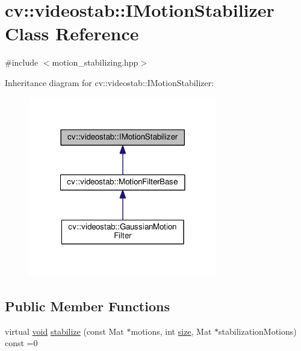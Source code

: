\hypertarget{classcv_1_1videostab_1_1IMotionStabilizer}{\section{cv\-:\-:videostab\-:\-:I\-Motion\-Stabilizer Class Reference}
\label{classcv_1_1videostab_1_1IMotionStabilizer}
}


{\ttfamily \#include $<$motion\-\_\-stabilizing.\-hpp$>$}



Inheritance diagram for cv\-:\-:videostab\-:\-:I\-Motion\-Stabilizer\-:\nopagebreak
\begin{figure}[H]
\begin{center}
\leavevmode
\includegraphics[width=234pt]{classcv_1_1videostab_1_1IMotionStabilizer__inherit__graph}
\end{center}
\end{figure}
\subsection*{Public Member Functions}
\begin{DoxyCompactItemize}
\item 
virtual \hyperlink{legacy_8hpp_a8bb47f092d473522721002c86c13b94e}{void} \hyperlink{classcv_1_1videostab_1_1IMotionStabilizer_a2094b1b0a3f53a2afc06f5691f562080}{stabilize} (const Mat $\ast$motions, int \hyperlink{legacy_8hpp_ae97003f8d5c64cdfb99f6f2606d121b6}{size}, Mat $\ast$stabilization\-Motions) const =0
\end{DoxyCompactItemize}


